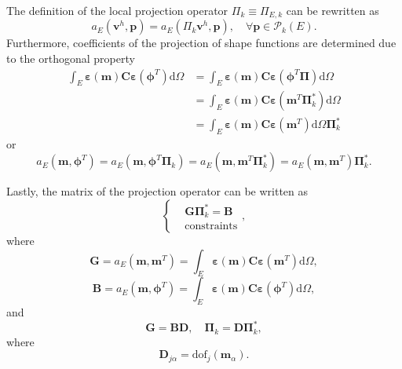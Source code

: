 \documentclass[kulak]{kulakarticle} %
\newcommand{\ud}{\mathrm{d}}
\begin{document}
The definition of the local projection operator $\Pi_k\equiv \Pi_{E,k}$ can be rewritten as 
\begin{equation}
    a_E(\bm{v}^h,\bm{p}) = a_E\left(\Pi_k\bm{v}^h,\bm{p}\right),\quad\forall \bm{p}\in\bm{\mathcal{P}}_k(E).
\end{equation}
Furthermore, coefficients of the projection of shape functions are determined due to the orthogonal property
\begin{equation}
    \begin{aligned}
        \int_E\bm{\varepsilon}(\bm{m})\bm{C}\bm{\varepsilon}(\bm{\phi}^T)\ud\Omega &= \int_E\bm{\varepsilon}(\bm{m})\bm{C}\bm{\varepsilon}(\bm{\phi}^T\bm{\Pi})\ud\Omega \\ &=
        \int_E\bm{\varepsilon}(\bm{m})\bm{C}\bm{\varepsilon}(\bm{m}^T\bm{\Pi}_k^*)\ud\Omega \\ &= \int_E\bm{\varepsilon}(\bm{m})\bm{C}\bm{\varepsilon}(\bm{m}^T)\ud\Omega\bm{\Pi}_k^*
    \end{aligned}
\end{equation}
or
\begin{equation}
    a_E\left(\bm{m},\bm{\phi}^T\right) = a_E\left(\bm{m},\bm{\phi}^T\bm{\Pi}_k\right) = a_E\left(\bm{m},\bm{m}^T\bm{\Pi}_k^*\right) = a_E\left(\bm{m},\bm{m}^T\right)\bm{\Pi}_k^*.
\end{equation}

Lastly, the matrix of the projection operator can be written as 
\begin{equation}
    \label{r5.s2.projection1}
    \left\{
        \begin{aligned}
            &\bm{G}\bm{\Pi}_k^* = \bm{B}\\
            &\text{constraints}
        \end{aligned}
    \right.,
\end{equation}
where 
\begin{equation}
    \label{r5.s2.G}
    \bm{G} = a_E\left(\bm{m},\bm{m}^T\right) = \int_E\bm{\varepsilon}(\bm{m})\bm{C}\bm{\varepsilon}(\bm{m}^T)\ud\Omega,
\end{equation}
\begin{equation}
    \label{r4.s2.B}
    \bm{B} = a_E\left(\bm{m},\bm{\phi}^T\right) = \int_E\bm{\varepsilon}(\bm{m})\bm{C}\bm{\varepsilon}(\bm{\phi}^T)\ud\Omega,
\end{equation}
and 
\begin{equation}
    \bm{G} = \bm{B}\bm{D},\quad\bm{\Pi}_k = \bm{D}\bm{\Pi}_k^{*},
\end{equation}
where 
\begin{equation}
    \bm{D}_{j\alpha} = \text{dof}_j(\bm{m}_\alpha).
\end{equation}
\end{document}
